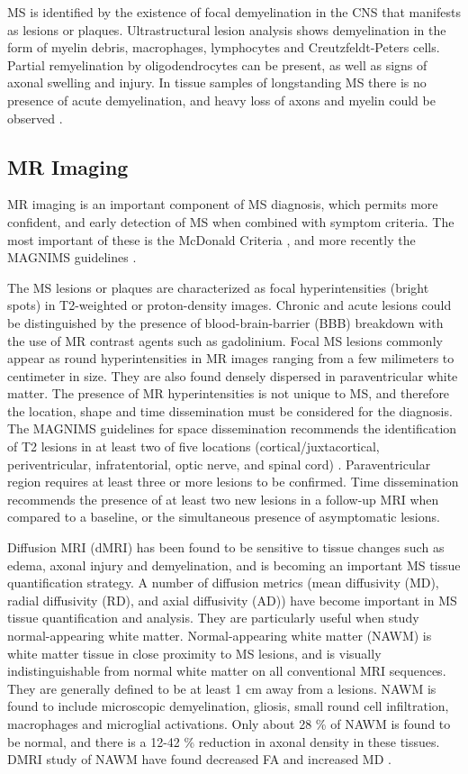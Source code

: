 MS is identified by the existence of focal demyelination in the CNS that manifests as lesions or plaques. Ultrastructural lesion analysis shows demyelination in the form of myelin debris, macrophages, lymphocytes and Creutzfeldt-Peters cells. Partial remyelination by oligodendrocytes can be present, as well as signs of axonal swelling and injury. In tissue samples of longstanding MS there is no presence of acute demyelination, and heavy loss of axons and myelin could be observed \cite{Filippi2012}. 

\subsection{MR Imaging}

MR imaging is an important component of MS diagnosis, which permits more confident, and early detection of MS when combined with symptom criteria. The most important of these is the McDonald Criteria \cite{Polman2011}, and more recently the MAGNIMS guidelines \cite{Filippi2016}. 

The MS lesions or plaques are characterized as focal hyperintensities (bright spots) in T2-weighted or proton-density images. Chronic and acute lesions could be distinguished by the presence of blood-brain-barrier (BBB) breakdown with the use of MR contrast agents such as gadolinium. Focal MS lesions commonly appear as round hyperintensities in MR images ranging from a few milimeters to centimeter in size. They are also found densely dispersed in paraventricular white matter. The presence of MR hyperintensities is not unique to MS, and therefore the location, shape and time dissemination must be considered for the diagnosis. The MAGNIMS guidelines for space dissemination recommends the identification of T2 lesions in at least two of five locations (cortical/juxtacortical, periventricular, infratentorial, optic nerve, and spinal cord) \cite{Filippi2016}. Paraventricular region requires at least three or more lesions to be confirmed. Time dissemination recommends the presence of at least two new lesions in a follow-up MRI when compared to a baseline, or the simultaneous presence of asymptomatic lesions. 

Diffusion MRI (dMRI) has been found to be sensitive to tissue changes such as edema, axonal injury and demyelination, and is becoming an important MS tissue quantification strategy. A number of diffusion metrics (mean diffusivity (MD), radial diffusivity (RD), and axial diffusivity (AD)) have become important in MS tissue quantification and analysis.  They are particularly useful when study normal-appearing white matter. Normal-appearing white matter (NAWM) is white matter tissue in close proximity to MS lesions, and is visually indistinguishable from normal white matter on all conventional MRI sequences. They are generally defined to be at least 1 cm away from a lesions. NAWM is found to include microscopic demyelination, gliosis, small round cell infiltration, macrophages and microglial activations. Only about 28 \% of NAWM is found to be normal, and there is a 12-42 \% reduction in axonal density in these tissues. DMRI study of NAWM have found decreased FA and increased MD \cite{Ciccarelli2003d,DeGroot2013}.  

